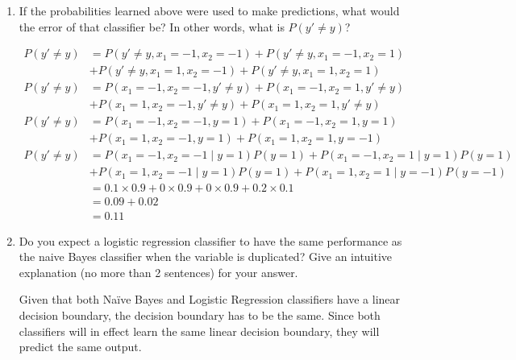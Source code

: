 \begin{enumerate}
\begin{enumerate}
  \item \relax[3 points] If the probabilities learned above were used to
    make predictions, what would the error of that classifier be? In
    other words, what is $P(y' \ne y)$?


\begin{equation*}
\begin{aligned}
P(y' \ne y) &= P(y' \ne y, x_1 = -1, x_2=-1) + P(y' \ne y, x_1 = -1, x_2=1) \\&+ P(y' \ne y, x_1 = 1, x_2=-1) + P(y' \ne y, x_1 = 1, x_2=1) \\
P(y' \ne y) &= P(x_1 = -1, x_2=-1, y' \ne y) + P(x_1 = -1, x_2=1,y' \ne y) \\&+ P(x_1 = 1, x_2=-1,y' \ne y) + P(x_1 = 1, x_2=1,y' \ne y) \\
P(y' \ne y) &= P(x_1 = -1, x_2=-1, y=1) + P(x_1 = -1, x_2=1,y=1) \\&+ P(x_1 = 1, x_2=-1,y=1) + P(x_1 = 1, x_2=1,y=-1) \\
P(y' \ne y) &= P(x_1 = -1, x_2=-1 \mid y=1) P(y=1)+ P(x_1 = -1, x_2=1 \mid y=1) P(y=1) \\&+ P(x_1 = 1, x_2=-1 \mid y=1) P(y=1) + P(x_1 = 1, x_2=1 \mid y=-1) P(y=-1) \\
&= 0.1 \times 0.9 + 0 \times 0.9 + 0 \times 0.9 + 0.2 \times 0.1\\
&= 0.09 + 0.02\\
&= 0.11
\end{aligned}
\end{equation*} 


  \item \relax[2 points] Do you expect a logistic regression
    classifier to have the same performance as the naive Bayes
    classifier when the variable is duplicated? Give an intuitive
    explanation (no more than 2 sentences) for your answer.

Given that both Na\"ive Bayes and Logistic Regression classifiers have a linear decision boundary, the decision boundary has to be the same. Since both classifiers will in effect learn the same linear decision boundary, they will predict the same output.
  \end{enumerate}

\end{enumerate}




